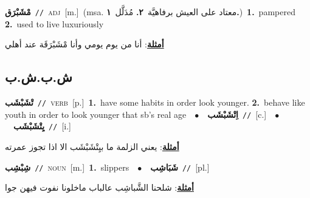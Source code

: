 \documentclass[10pt,a4paper,twoside]{article} %
\begin{document}
\begin{multicols}{2}
{\setlength\topsep{0pt}\textbf{\foreignlanguage{arabic}{مْشَبْرَق}}\ {\color{gray}\texttt{//}\color{black}}\ \textsc{adj}\ [m.]\ \color{gray}(msa. \foreignlanguage{arabic}{معتاد على العيش برفاهيَّة}~\foreignlanguage{arabic}{\textbf{٢.}}  \foreignlanguage{arabic}{مُدَلَّل}~\foreignlanguage{arabic}{\textbf{١.}})\color{black}\ \textbf{1.}~pampered  \textbf{2.}~used to live luxuriously\  \begin{flushright}\color{gray}\foreignlanguage{arabic}{\textbf{\underline{\foreignlanguage{arabic}{أمثلة}}}: أنا من يوم يومي وأنا مْشَبْرَقَة عند أهلي}\end{flushright}\color{black}} \vspace{2mm}

\vspace{-3mm}
\subsection*{\color{blue}\foreignlanguage{arabic}{ش.ب.ش.ب}\color{blue}{}} 

{\setlength\topsep{0pt}\textbf{\foreignlanguage{arabic}{تْشَبْشَب}}\ {\color{gray}\texttt{//}\color{black}}\ \textsc{verb}\ [p.]\ \textbf{1.}~have some habits in order look younger.  \textbf{2.}~behave like youth in order to look younger that sb's real age\ \ $\bullet$\ \ \setlength\topsep{0pt}\textbf{\foreignlanguage{arabic}{اِتْشَبْشَب}}\ {\color{gray}\texttt{//}\color{black}}\ [c.]\ \ $\bullet$\ \ \setlength\topsep{0pt}\textbf{\foreignlanguage{arabic}{يِتْشَبْشَب}}\ {\color{gray}\texttt{//}\color{black}}\ [i.]\  \begin{flushright}\color{gray}\foreignlanguage{arabic}{\textbf{\underline{\foreignlanguage{arabic}{أمثلة}}}: يعني الزلمة ما بيِتْشَبْشَب الا اذا تجوز عمرته}\end{flushright}\color{black}} \vspace{2mm}

{\setlength\topsep{0pt}\textbf{\foreignlanguage{arabic}{شِبْشِب}}\ {\color{gray}\texttt{//}\color{black}}\ \textsc{noun}\ [m.]\ \textbf{1.}~slippers\ \ $\bullet$\ \ \setlength\topsep{0pt}\textbf{\foreignlanguage{arabic}{شَبَاشِب}}\ {\color{gray}\texttt{//}\color{black}}\ [pl.]\  \begin{flushright}\color{gray}\foreignlanguage{arabic}{\textbf{\underline{\foreignlanguage{arabic}{أمثلة}}}: شلحنا الشَّباشِب عالباب ماخلونا نفوت فيهن جوا}\end{flushright}\color{black}} \vspace{2mm}


\end{multicols}
\end{document}
